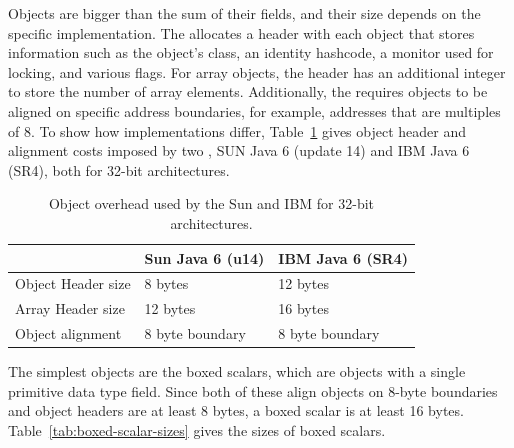 Objects are bigger than the sum of their fields, and their size depends on the
specific \jre implementation. The \jre allocates a header with each object that
stores information such as the object's class, an identity hashcode, a monitor
used for locking, and various flags. For array objects, the header has an
additional integer to store the number of array elements. Additionally,  the
\jre requires objects to be aligned on specific address boundaries, for
example, addresses that are multiples of 8. To show how implementations differ, Table~\ref{tab:object-overhead} gives object header and alignment
costs imposed by two \jres, SUN Java 6 (update 14) and IBM Java 6 (SR4), both for
32-bit architectures.
\begin{table}
  \centering
 \begin{tabular}{lll} \toprule
 	& Sun Java 6 (u14) & IBM Java 6 (SR4) \\ \midrule
 	Object Header size & 8 bytes & 12 bytes \\
 	Array Header size & 12 bytes & 16 bytes \\
 	Object alignment & 8 byte boundary & 8 byte boundary \\
 	\bottomrule
 \end{tabular}
  \caption{Object overhead used by the Sun and IBM \jres for 32-bit architectures.}
  \label{tab:object-overhead}
\end{table} 
   
The simplest objects are the boxed scalars, which are objects with a single
primitive data type field. Since both of these \jres align objects on
8-byte boundaries and object headers are at least 8 bytes, a boxed scalar is at
least 16 bytes. Table~\ref{tab:boxed-scalar-sizes} gives the sizes of boxed
scalars.

